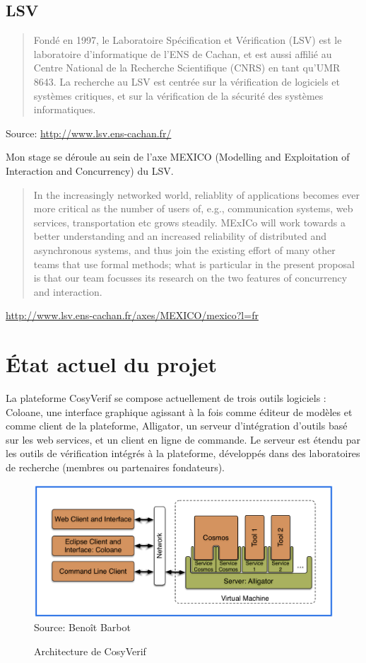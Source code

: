 \documentclass{report}
\begin{document}
\subsection{LSV}

\begin{quotation}
Fondé en 1997, le Laboratoire Spécification et Vérification (LSV) est le laboratoire d'informatique de l'ENS de Cachan, 
et est aussi affilié au Centre National de la Recherche Scientifique (CNRS) en tant qu'UMR 8643. La recherche au LSV est
centrée sur la vérification de logiciels et systèmes critiques, et sur la vérification de la sécurité des systèmes informatiques.
\end{quotation}
\hfill{Source: \url{http://www.lsv.ens-cachan.fr/}}

Mon stage se déroule au sein de l'axe MEXICO (Modelling and Exploitation of
Interaction and Concurrency) du LSV.

\begin{quotation}
In the increasingly networked world, reliablity of applications becomes ever more critical as the number of users of, e.g., communication systems, web services, transportation etc grows steadily. MExICo will work towards a better understanding and an increased reliability of distributed and asynchronous systems, and thus join the existing effort of many other teams that use formal methods; what is particular in the present proposal is that our team focusses its research on the two features of concurrency and interaction.
\end{quotation}
\hfill{\url{http://www.lsv.ens-cachan.fr/axes/MEXICO/mexico?l=fr}}

\section{État actuel du projet}

La plateforme CosyVerif se compose actuellement de trois outils logiciels :
Coloane, une interface graphique agissant à la fois comme éditeur de modèles
et comme client de la plateforme,
Alligator, un serveur d'intégration d'outils basé sur les web services,
et un client en ligne de commande.
Le serveur est étendu par les outils de vérification intégrés à la plateforme,
développés dans des laboratoires de recherche (membres ou partenaires fondateurs).

\begin{figure}[h!]
    \centering
    \includegraphics[scale=0.50]{img/cosyverif_schema.pdf}
    \\
    \hfill{Source: Benoît Barbot}
    \caption{Architecture de CosyVerif}
\end{figure}
\end{document}
